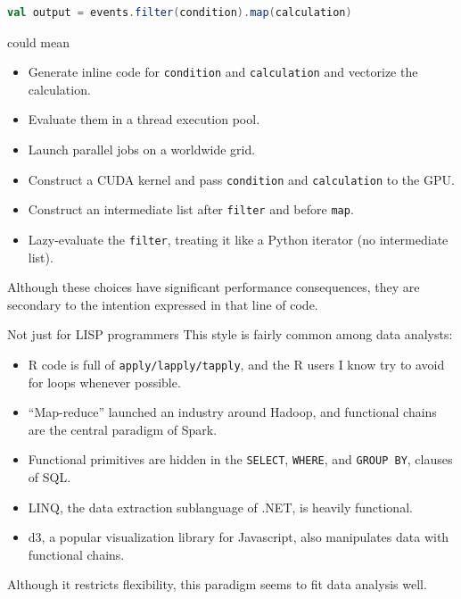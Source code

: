 \documentclass{beamer}
\begin{document}
\begin{frame}[fragile]{}
\vspace{1.2 cm}
\begin{minipage}[fragile]{0.85\linewidth}
\begin{lstlisting}[language=scala, basicstyle=\ttfamily\scriptsize, frame=single]
val output = events.filter(condition).map(calculation)
\end{lstlisting}
\end{minipage}

could mean

\begin{itemize}
\item Generate inline code for {\small\tt condition} and {\small\tt calculation} and vectorize the calculation.
\item Evaluate them in a thread execution pool.
\item Launch parallel jobs on a worldwide grid.
\item Construct a CUDA kernel and pass {\small\tt condition} and {\small\tt calculation} to the GPU.
\item Construct an intermediate list after {\small\tt filter} and before {\small\tt map}.
\item Lazy-evaluate the {\small\tt filter}, treating it like a Python iterator (no intermediate list).
\end{itemize}

Although these choices have significant performance consequences, they are secondary to the intention expressed in that line of code.
\end{frame}

\begin{frame}{Not just for LISP programmers}
\vspace{0.5 cm}
This style is fairly common among data analysts:

\begin{itemize}
\item R code is full of {\small\tt apply/lapply/tapply}, and the R users I know try to avoid for loops whenever possible.
\item ``Map-reduce'' launched an industry around Hadoop, and functional chains are the central paradigm of Spark.
\item Functional primitives are hidden in the {\small\tt SELECT}, {\small\tt WHERE}, and {\small\tt GROUP BY}, clauses of SQL.
\item LINQ, the data extraction sublanguage of .NET, is heavily functional.
\item d3, a popular visualization library for Javascript, also manipulates data with functional chains.
\end{itemize}

Although it restricts flexibility, this paradigm seems to fit data analysis well.
\end{frame}
\end{document}

